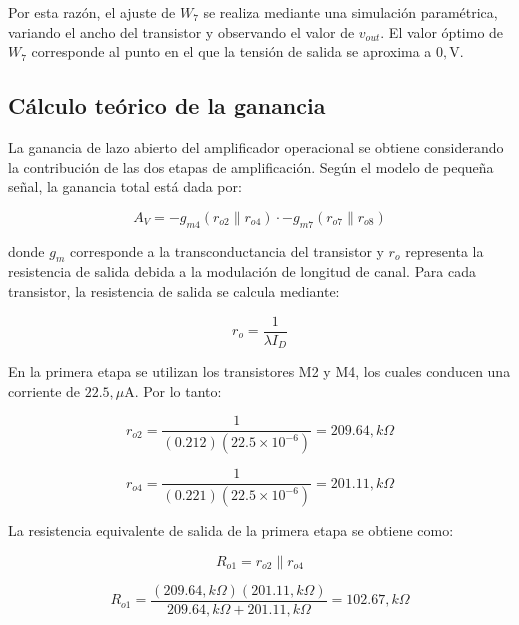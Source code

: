 \documentclass[journal]{IEEEtran}
\begin{document}
Por esta razón, el ajuste de $W_7$ se realiza mediante una simulación paramétrica, variando el ancho del transistor y observando el valor de $v_{out}$. El valor óptimo de $W_7$ corresponde al punto en el que la tensión de salida se aproxima a $0,\text{V}$.


\subsection{Cálculo teórico de la ganancia}


La ganancia de lazo abierto del amplificador operacional se obtiene considerando la contribución de las dos etapas de amplificación. Según el modelo de pequeña señal, la ganancia total está dada por:

\begin{equation}
A_V =
-g_{m4}\left(r_{o2}\parallel r_{o4}\right)
\cdot
-g_{m7}\left(r_{o7}\parallel r_{o8}\right)
\end{equation}

donde $g_m$ corresponde a la transconductancia del transistor y $r_o$ representa la resistencia de salida debida a la modulación de longitud de canal. Para cada transistor, la resistencia de salida se calcula mediante:

\begin{equation}
r_o=\frac{1}{\lambda I_D}
\end{equation}

En la primera etapa se utilizan los transistores M2 y M4, los cuales conducen una corriente de $22.5,\mu\text{A}$. Por lo tanto:

\begin{equation}
r_{o2}=
\frac{1}{(0.212)(22.5\times10^{-6})}
=209.64,k\Omega
\end{equation}

\begin{equation}
r_{o4}=
\frac{1}{(0.221)(22.5\times10^{-6})}
=201.11,k\Omega
\end{equation}

La resistencia equivalente de salida de la primera etapa se obtiene como:

\begin{equation}
R_{o1}=r_{o2}\parallel r_{o4}
\end{equation}

\begin{equation}
R_{o1}=
\frac{(209.64,k\Omega)(201.11,k\Omega)}
{209.64,k\Omega+201.11,k\Omega}
=102.67,k\Omega
\end{equation}
\end{document}

